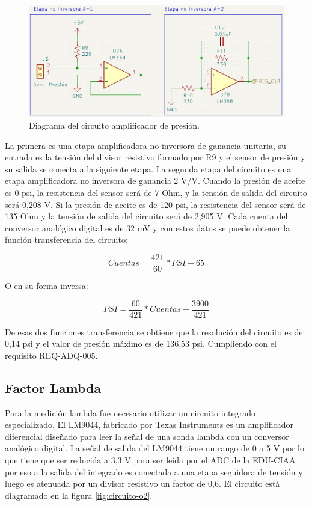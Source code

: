 \begin{figure}[htpb]
\centering
\includegraphics[width=.9\textwidth]{./Figures/circuito-presion.png}
\caption{Diagrama del circuito amplificador de presión.}
\label{fig:circuito-presion}
\end{figure}

La primera es una etapa amplificadora no inversora de ganancia unitaria, su entrada es la tensión del divisor resistivo formado por R9 y el sensor de presión y su salida se conecta a la siguiente etapa. La segunda etapa del circuito es una etapa amplificadora no inversora de ganancia 2 V/V.
Cuando la presión de aceite es 0 psi, la resistencia del sensor será de 7 Ohm, y la tensión de salida del circuito será 0,208 V. Si la presión de aceite es de 120 psi, la resistencia del sensor será de 135 Ohm y la tensión de salida del circuito será de 2,905 V. Cada cuenta del conversor analógico digital es de 32 mV y con estos datos se puede obtener la función transferencia del circuito:

\[ Cuentas = \frac{421}{60} * PSI + 65\]

O en su forma inversa:

\[ PSI = \frac{60}{421} * Cuentas - \frac{3900}{421} \]

De esas dos funciones transferencia se obtiene que la resolución del circuito es de 0,14 psi y el valor de presión máximo es de 136,53 psi. Cumpliendo con el requisito REQ-ADQ-005.

\subsection{Factor Lambda}

Para la medición lambda fue necesario utilizar un circuito integrado especializado. El LM9044, fabricado por Texas Instruments es un amplificador diferencial diseñado para leer la señal de una sonda lambda con un conversor analógico digital. La señal de salida del LM9044 tiene un rango de 0 a 5 V por lo que tiene que ser reducida a 3,3 V para ser leída por el ADC de la EDU-CIAA por eso a la salida del integrado es conectada a una etapa seguidora de tensión y luego es atenuada por un divisor resistivo un factor de 0,6. El circuito está diagramado en la figura \ref{fig:circuito-o2}.

